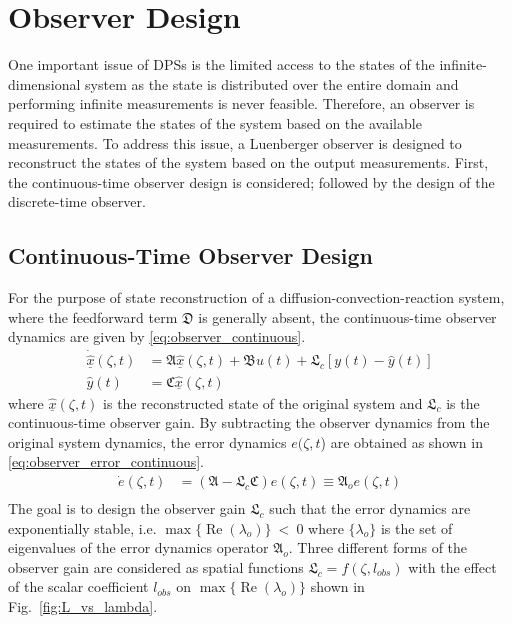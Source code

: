\section{Observer Design}
One important issue of DPSs is the limited access to the states of the infinite-dimensional system as the state is distributed over the entire domain and performing infinite measurements is never feasible. Therefore, an observer is required to estimate the states of the system based on the available measurements. To address this issue, a Luenberger observer is designed to reconstruct the states of the system based on the output measurements. First, the continuous-time observer design is considered; followed by the design of the discrete-time observer.

\subsection{Continuous-Time Observer Design}
For the purpose of state reconstruction of a diffusion-convection-reaction system, where the feedforward term $\mathfrak{D}$ is generally absent, the continuous-time observer dynamics are given by \eqref{eq:observer_continuous}.
\begin{equation} \label{eq:observer_continuous}
    \begin{aligned}
        \dot{\underline{\hat{x}}}(\zeta, t) &= \mathfrak{A} \underline{\hat{x}}(\zeta, t) + \mathfrak{B} u(t) + \mathfrak{L}_c [y(t) - \hat{y}(t)] \\
        \hat{y}(t) &= \mathfrak{C} \underline{\hat{x}}(\zeta, t)
    \end{aligned}
\end{equation}
where $\underline{\hat{x}}(\zeta, t)$ is the reconstructed state of the original system and $\mathfrak{L}_c$ is the continuous-time observer gain. By subtracting the observer dynamics from the original system dynamics, the error dynamics $e(\zeta,t$) are obtained as shown in \eqref{eq:observer_error_continuous}.
\begin{equation} \label{eq:observer_error_continuous}
    \begin{aligned}
        \dot{e}(\zeta, t) &= (\mathfrak{A} - \mathfrak{L}_c \mathfrak{C}) e(\zeta, t) \equiv \mathfrak{A}_o e(\zeta,t) \\
    \end{aligned}
\end{equation}
The goal is to design the observer gain $\mathfrak{L}_c$ such that the error dynamics are exponentially stable, i.e. $\max\{\operatorname{Re}(\lambda_{o})\}~<~0$ where $\{\lambda_{o}\}$ is the set of eigenvalues of the error dynamics operator $\mathfrak{A}_o$. Three different forms of the observer gain are considered as spatial functions $\mathfrak{L}_c = f(\zeta, l_{obs})$ with the effect of the scalar coefficient $l_{obs}$ on $\max\{\operatorname{Re}(\lambda_{o})\}$ shown in Fig.~\ref{fig:L_vs_lambda}.

